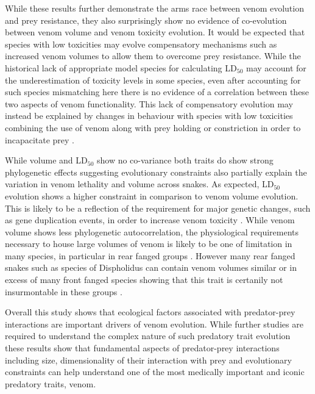 While these results further demonstrate the arms race between venom evolution and prey resistance, they also surprisingly show no evidence of co-evolution between venom volume and venom toxicity evolution. It would be expected that species with low toxicities may evolve compensatory mechanisms such as increased venom volumes to allow them to overcome prey resistance. While the historical lack of appropriate model species for calculating LD$_{50}$ may account for the underestimation of toxicity levels in some species, even after accounting for such species mismatching here there is no evidence of a correlation between these two aspects of venom functionality. This lack of compensatory evolution may instead be explained by changes in behaviour with species with low toxicities combining the use of venom along with prey holding or constriction in order to incapacitate prey \citep{shine1985prey}.


While volume and LD$_{50}$ show no co-variance both traits do show strong phylogenetic effects suggesting evolutionary constraints also partially explain the variation in venom lethality and volume across snakes. As expected, LD$_{50}$ evolution shows a higher constraint in comparison to venom volume evolution. This is likely to be a reflection of the requirement for major genetic changes, such as gene duplication events, in order to increase venom toxicity \citep{vonk2013king}. While venom volume shows less phylogenetic autocorrelation, the physiological requirements necessary to house large volumes of venom is likely to be one of limitation in many species, in particular in rear fanged groups \citep{kardong1982evolution}. However many rear fanged snakes such as species of Dispholidus can contain venom volumes similar or in excess of many front fanged species showing that this trait is certanily not insurmontable in these groups \citep{kochva1980venom,fry2008evolution}.


Overall this study shows that ecological factors associated with predator-prey interactions are important drivers of venom evolution. While further studies are required to understand the complex nature of such predatory trait evolution these results show that fundamental aspects of predator-prey interactions including size, dimensionality of their interaction with prey and evolutionary constraints can help understand one of the most medically important and iconic predatory traits, venom.






